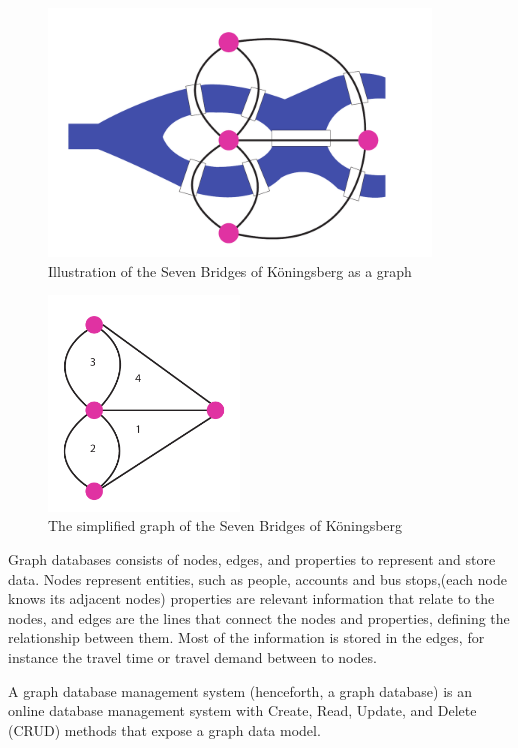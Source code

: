 \begin{figure}[H]
  \centering
  \includegraphics[width=4in]{assets/7bridges.pdf}
  \caption{Illustration of the Seven Bridges of Köningsberg as a graph} 
  \label{fig:7bridgesIllustration}
\end{figure}

\begin{figure}[H]
  \centering
  \includegraphics[width=2in]{assets/7bridges2.pdf}
  \caption{The simplified graph of the Seven Bridges of Köningsberg} 
  \label{fig:7bridgesSimplification}
\end{figure}


Graph databases consists of nodes, edges, and properties to represent and store data. Nodes represent entities, such as people, accounts and bus stops,(each node knows its adjacent nodes) properties are relevant information that relate to the nodes, and edges are the lines that connect the nodes and properties, defining the relationship between them. Most of the information is stored in the edges, for instance the travel time or travel demand between to nodes. 

A graph database management system (henceforth, a graph database) is an online database management system with Create, Read, Update, and Delete (CRUD) methods that expose a graph data model. 

